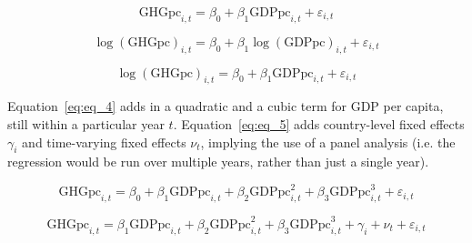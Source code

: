 \begin{equation}\label{eq:eq_1}
    \text{GHGpc}_{i,t} = \beta_0 + \beta_1 \text{GDPpc}_{i,t} + \varepsilon_{i,t}
\end{equation}

\begin{equation}\label{eq:eq_2}
    \log(\text{GHGpc})_{i,t} = \beta_0 + \beta_1 \log(\text{GDPpc})_{i,t} + \varepsilon_{i,t}
\end{equation}

\begin{equation}\label{eq:eq_3}
    \log(\text{GHGpc})_{i,t} = \beta_0 + \beta_1 \text{GDPpc}_{i,t} + \varepsilon_{i,t}
\end{equation}

Equation~\ref{eq:eq_4} adds in a quadratic and a cubic term for GDP per capita, still within a particular year $t$. Equation~\ref{eq:eq_5} adds country-level fixed effects $\gamma_i$ and time-varying fixed effects $\nu_t$, implying the use of a panel analysis (i.e. the regression would be run over multiple years, rather than just a single year).

\begin{equation}\label{eq:eq_4}
    \text{GHGpc}_{i,t} = \beta_0 + \beta_1 \text{GDPpc}_{i,t} + \beta_2 \text{GDPpc}^2_{i,t} + \beta_3 \text{GDPpc}_{i,t}^3 + \varepsilon_{i,t}
\end{equation}

\begin{equation}\label{eq:eq_5}
    \text{GHGpc}_{i,t} = \beta_1 \text{GDPpc}_{i,t} + \beta_2 \text{GDPpc}^2_{i,t} + \beta_3 \text{GDPpc}_{i,t}^3 + \gamma_i + \nu_t + \varepsilon_{i,t}
\end{equation}

